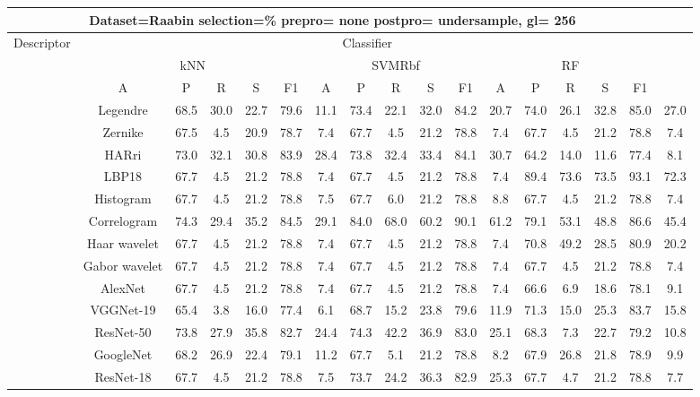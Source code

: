 \documentclass[12pt,italian]{article}
\begin{document}
\begin{tiny}
\begin{longtable}{lcccccccccccccccc}
\toprule
\multicolumn{16}{c}{Dataset=Raabin selection=\% prepro= none postpro= undersample, gl= 256} \\ 
\toprule
Descriptor & \multicolumn{15}{c}{Classifier} \\ 
& \multicolumn{5}{c}{kNN} & \multicolumn{5}{c}{SVMRbf} & \multicolumn{5}{c}{RF} \\ 
& A & P & R & S & F1 & A & P & R & S & F1 & A & P & R & S & F1 \\ 
\midrule
& Legendre & 68.5 & 30.0 & 22.7 & 79.6 & 11.1 & 73.4 & 22.1 & 32.0 & 84.2 & 20.7 & 74.0 & 26.1 & 32.8 & 85.0 & 27.0 \\ 
& Zernike & 67.5 &  4.5 & 20.9 & 78.7 &  7.4 & 67.7 &  4.5 & 21.2 & 78.8 &  7.4 & 67.7 &  4.5 & 21.2 & 78.8 &  7.4 \\ 
& HARri & 73.0 & 32.1 & 30.8 & 83.9 & 28.4 & 73.8 & 32.4 & 33.4 & 84.1 & 30.7 & 64.2 & 14.0 & 11.6 & 77.4 &  8.1 \\ 
& LBP18 & 67.7 &  4.5 & 21.2 & 78.8 &  7.4 & 67.7 &  4.5 & 21.2 & 78.8 &  7.4 & 89.4 & 73.6 & 73.5 & 93.1 & 72.3 \\ 
& Histogram & 67.7 &  4.5 & 21.2 & 78.8 &  7.5 & 67.7 &  6.0 & 21.2 & 78.8 &  8.8 & 67.7 &  4.5 & 21.2 & 78.8 &  7.4 \\ 
& Correlogram & 74.3 & 29.4 & 35.2 & 84.5 & 29.1 & 84.0 & 68.0 & 60.2 & 90.1 & 61.2 & 79.1 & 53.1 & 48.8 & 86.6 & 45.4 \\ 
& Haar wavelet & 67.7 &  4.5 & 21.2 & 78.8 &  7.4 & 67.7 &  4.5 & 21.2 & 78.8 &  7.4 & 70.8 & 49.2 & 28.5 & 80.9 & 20.2 \\ 
& Gabor wavelet & 67.7 &  4.5 & 21.2 & 78.8 &  7.4 & 67.7 &  4.5 & 21.2 & 78.8 &  7.4 & 67.7 &  4.5 & 21.2 & 78.8 &  7.4 \\ 
& AlexNet & 67.7 &  4.5 & 21.2 & 78.8 &  7.4 & 67.7 &  4.5 & 21.2 & 78.8 &  7.4 & 66.6 &  6.9 & 18.6 & 78.1 &  9.1 \\ 
& VGGNet-19 & 65.4 &  3.8 & 16.0 & 77.4 &  6.1 & 68.7 & 15.2 & 23.8 & 79.6 & 11.9 & 71.3 & 15.0 & 25.3 & 83.7 & 15.8 \\ 
& ResNet-50 & 73.8 & 27.9 & 35.8 & 82.7 & 24.4 & 74.3 & 42.2 & 36.9 & 83.0 & 25.1 & 68.3 &  7.3 & 22.7 & 79.2 & 10.8 \\ 
& GoogleNet & 68.2 & 26.9 & 22.4 & 79.1 & 11.2 & 67.7 &  5.1 & 21.2 & 78.8 &  8.2 & 67.9 & 26.8 & 21.8 & 78.9 &  9.9 \\ 
& ResNet-18 & 67.7 &  4.5 & 21.2 & 78.8 &  7.5 & 73.7 & 24.2 & 36.3 & 82.9 & 25.3 & 67.7 &  4.7 & 21.2 & 78.8 &  7.7 \\ 

\end{longtable}
\end{tiny}
\end{document}
